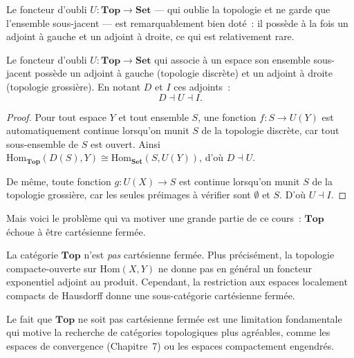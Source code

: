 Le foncteur d'oubli $U\colon \mathbf{Top} \to \mathbf{Set}$ --- qui
\og oublie\fg{} la topologie et ne garde que l'ensemble sous-jacent --- est
remarquablement bien dot\'e~: il poss\`ede \`a la fois un adjoint \`a gauche et
un adjoint \`a droite, ce qui est relativement rare.

\begin{proposition}
Le foncteur d'oubli $U\colon \mathbf{Top} \to \mathbf{Set}$ qui associe \`a un espace
son ensemble sous-jacent poss\`ede un adjoint \`a gauche (topologie discr\`ete) et un
adjoint \`a droite (topologie grossi\`ere). En notant $D$ et $I$ ces adjoints~:
\[
  D \dashv U \dashv I.
\]
\end{proposition}

\begin{proof}
Pour tout espace $Y$ et tout ensemble $S$, une fonction $f\colon S \to U(Y)$ est
automatiquement continue lorsqu'on munit $S$ de la topologie discr\`ete, car tout
sous-ensemble de $S$ est ouvert. Ainsi $\mathrm{Hom}_\mathbf{Top}(D(S),Y) \cong
\mathrm{Hom}_\mathbf{Set}(S,U(Y))$, d'o\`u $D \dashv U$.

De m\^eme, toute fonction $g\colon U(X) \to S$ est continue lorsqu'on munit $S$ de la
topologie grossi\`ere, car les seules pr\'eimages \`a v\'erifier sont $\emptyset$ et $S$.
D'o\`u $U \dashv I$.
\end{proof}

Mais voici le probl\`eme qui va motiver une grande partie de ce cours~:
$\mathbf{Top}$ \'echoue \`a \^etre cart\'esienne ferm\'ee.

\begin{theoreme}
La cat\'egorie $\mathbf{Top}$ n'est \emph{pas} cart\'esienne ferm\'ee. Plus pr\'ecis\'ement,
la topologie compacte-ouverte sur $\mathrm{Hom}(X,Y)$ ne donne pas en g\'en\'eral un
foncteur exponentiel adjoint au produit. Cependant, la restriction aux espaces
localement compacts de Hausdorff donne une sous-cat\'egorie cart\'esienne ferm\'ee.
\end{theoreme}

\begin{attention}
Le fait que $\mathbf{Top}$ ne soit pas cart\'esienne ferm\'ee est une limitation
fondamentale qui motive la recherche de cat\'egories topologiques plus agr\'eables,
comme les espaces de convergence (Chapitre~7) ou les espaces compactement engendr\'es.
\end{attention}

